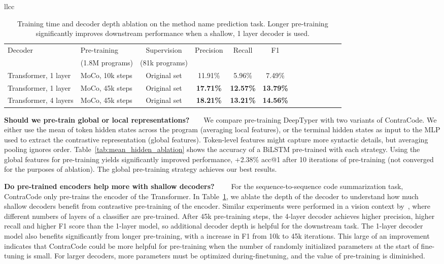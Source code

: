 \documentclass{article}
\newcommand{\thou}[0]{}
\newcommand{\ours}[0]{ContraCode}
\begin{document}
\begin{table}[t]
{\begin{tabular}{llcc}
{{\begin{table*}
\caption{Training time and decoder depth ablation on the method name prediction task. Longer pre-training significantly improves downstream performance when a shallow, 1 layer decoder is used.} 
\label{tab:summarization_depth_ablation}
\footnotesize
\setlength\tabcolsep{3.5pt}
\centering
\begin{tabular}{llccccccccccc} \toprule
    \multirow{2}{*}{Decoder} & Pre-training & Supervision & \multirow{2}{*}{Precision} & \multirow{2}{*}{Recall} & \multirow{2}{*}{F1}\\    
    & (1.8M programs) & (81k programs) & \\
    \midrule
    Transformer, 1 layer & MoCo, 10k steps & Original set & 11.91\% & 5.96\% & 7.49\% & \\
    Transformer, 1 layer & MoCo, 45k steps & Original set & \textbf{17.71\%} & \textbf{12.57\%} & \textbf{13.79\%} & \\
    Transformer, 4 layers & MoCo, 45k steps & Original set & \textbf{18.21\%} & \textbf{13.21\%} & \textbf{14.56\%} \\
     \bottomrule 
\end{tabular}
\end{table*}


\textbf{Should we pre-train global or local representations?}~~~~We compare pre-training DeepTyper with two variants of \ours{}. We either use the mean of token hidden states across the program (averaging local features), or the terminal hidden states as input to the MLP used to extract the contrastive representation  (global features). Token-level features might capture more syntactic details, but averaging pooling ignores order. Table~\ref{tab:mean_hidden_ablation} shows the accuracy of a BiLSTM pre-trained with each strategy. Using the global features for pre-training yields significantly improved performance, +2.38\% acc@1 after 10\thou{} iterations of pre-training (not converged for the purposes of ablation). The global pre-training strategy achieves our best results.

\textbf{Do pre-trained encoders help more with shallow decoders?}~~~~
For the sequence-to-sequence code summarization task, \ours{} only pre-trains the encoder of the Transformer. In Table~\ref{tab:summarization_depth_ablation}, we ablate the depth of the decoder to understand how much shallow decoders benefit from contrastive pre-training of the encoder. Similar experiments were performed in a vision context by~\cite{erhan2010does}, where different numbers of layers of a classifier are pre-trained. After 45k pre-training steps, the 4-layer decoder achieves  higher precision,  higher recall and  higher F1 score than the 1-layer model, so additional decoder depth is helpful for the downstream task. The 1-layer decoder model also benefits significantly from longer pre-training, with a  increase in F1 from 10k to 45k iterations. This large of an improvement indicates that \ours{} could be more helpful for pre-training when the number of randomly initialized parameters at the start of fine-tuning is small. For larger decoders, more parameters must be optimized during-finetuning, and the value of pre-training is diminished.

}}
\end{tabular}}
\end{table}
\end{document}
